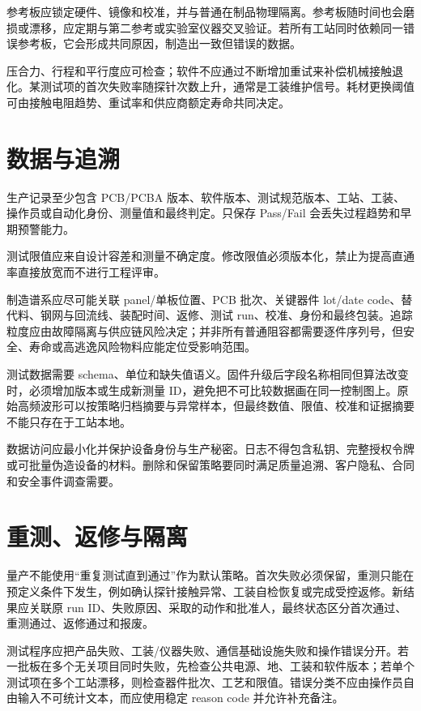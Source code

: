 参考板应锁定硬件、镜像和校准，并与普通在制品物理隔离。参考板随时间也会磨损或漂移，应定期与第二参考或实验室仪器交叉验证。若所有工站同时依赖同一错误参考板，它会形成共同原因，制造出一致但错误的数据。

压合力、行程和平行度应可检查；软件不应通过不断增加重试来补偿机械接触退化。某测试项的首次失败率随探针次数上升，通常是工装维护信号。耗材更换阈值可由接触电阻趋势、重试率和供应商额定寿命共同决定。

\section{数据与追溯}

生产记录至少包含 PCB/PCBA 版本、软件版本、测试规范版本、工站、工装、操作员或自动化身份、测量值和最终判定。只保存 Pass/Fail 会丢失过程趋势和早期预警能力。

测试限值应来自设计容差和测量不确定度。修改限值必须版本化，禁止为提高直通率直接放宽而不进行工程评审。

制造谱系应尽可能关联 panel/单板位置、PCB 批次、关键器件 lot/date code、替代料、钢网与回流线、装配时间、返修、测试 run、校准、身份和最终包装。追踪粒度应由故障隔离与供应链风险决定；并非所有普通阻容都需要逐件序列号，但安全、寿命或高逃逸风险物料应能定位受影响范围。

测试数据需要 schema、单位和缺失值语义。固件升级后字段名称相同但算法改变时，必须增加版本或生成新测量 ID，避免把不可比较数据画在同一控制图上。原始高频波形可以按策略归档摘要与异常样本，但最终数值、限值、校准和证据摘要不能只存在于工站本地。

数据访问应最小化并保护设备身份与生产秘密。日志不得包含私钥、完整授权令牌或可批量伪造设备的材料。删除和保留策略要同时满足质量追溯、客户隐私、合同和安全事件调查需要。

\section{重测、返修与隔离}

量产不能使用“重复测试直到通过”作为默认策略。首次失败必须保留，重测只能在预定义条件下发生，例如确认探针接触异常、工装自检恢复或完成受控返修。新结果应关联原 run ID、失败原因、采取的动作和批准人，最终状态区分首次通过、重测通过、返修通过和报废。

测试程序应把产品失败、工装/仪器失败、通信基础设施失败和操作错误分开。若一批板在多个无关项目同时失败，先检查公共电源、地、工装和软件版本；若单个测试项在多个工站漂移，则检查器件批次、工艺和限值。错误分类不应由操作员自由输入不可统计文本，而应使用稳定 reason code 并允许补充备注。

